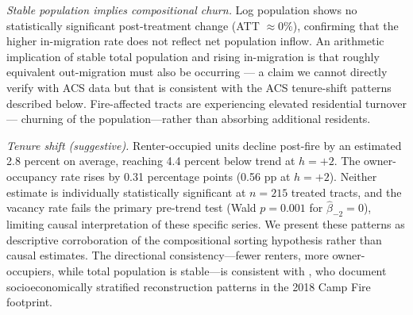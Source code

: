 \documentclass[12pt]{article}
\begin{document}
\emph{Stable population implies compositional churn.}
Log population shows no statistically significant post-treatment change
(ATT $\approx 0\%$), confirming that the higher in-migration rate does not
reflect net population inflow.
An arithmetic implication of stable total population and rising in-migration
is that roughly equivalent out-migration must also be occurring ---
a claim we cannot directly verify with ACS data but that is consistent
with the ACS tenure-shift patterns described below.
Fire-affected tracts are experiencing elevated residential turnover---
churning of the population---rather than absorbing additional residents.

\emph{Tenure shift (suggestive).}
Renter-occupied units decline post-fire by an estimated 2.8 percent
on average, reaching 4.4 percent below trend at $h = +2$.
The owner-occupancy rate rises by 0.31 percentage points
(0.56 pp at $h = +2$).
Neither estimate is individually statistically significant at $n = 215$
treated tracts, and the vacancy rate fails the primary pre-trend test
(Wald $p = 0.001$ for $\hat{\beta}_{-2} = 0$), limiting causal
interpretation of these specific series.
We present these patterns as descriptive corroboration of the
compositional sorting hypothesis rather than causal estimates.
The directional consistency---fewer renters, more owner-occupiers,
while total population is stable---is consistent with
\citet{mcconnell2024post}, who document socioeconomically stratified
reconstruction patterns in the 2018 Camp Fire footprint.
\end{document}
